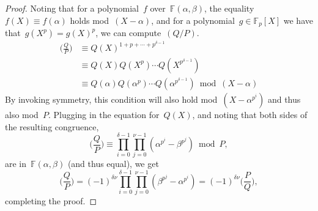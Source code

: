 \begin{theorem}
\begin{proof}
    Noting that for a polynomial~${f}$ over~${\mathbb{F}(\alpha,\beta)}$, the equality~${f(X) \equiv f(\alpha)}$ holds mod~${(X-\alpha)}$, and for a polynomial~${g \in \mathbb{F}_{p}[X]}$ we have that~${g(X^{p})=g(X)^{p}}$, we can compute~${(Q/P)}$.
    \begin{align*} \bigg( \frac{Q}{P} \bigg) & \equiv Q(X)^{1+p+\cdots+p^{\delta-1}} \\ & \equiv Q(X)Q(X^{p}) \cdots Q(X^{p^{\delta -1}}) \\ & \equiv Q(\alpha)Q(\alpha^{p}) \cdots Q(\alpha^{p^{\delta-1}}) \bmod (X-\alpha) \end{align*}
    By invoking symmetry, this condition will also hold mod~${(X-\alpha^{p^{i}})}$ and thus also mod~${P}$. Plugging in the equation for~$Q(X)$, and noting that both sides of the resulting congruence,
    \begin{equation}
      \bigg( \frac{Q}{P} \bigg) \equiv \prod_{i=0}^{\delta -1} \prod_{j=0}^{\nu -1} (\alpha^{p^{i}} - \beta^{p^{j}}) \bmod P,  
    \end{equation}
    are in~${\mathbb{F}(\alpha,\beta)}$ (and thus equal), we get
    \begin{equation}
      \bigg( \frac{Q}{P} \bigg) = (-1)^{\delta \nu} \prod_{i=0}^{\delta -1} \prod_{j=0}^{\nu -1} (\beta^{p^{j}} - \alpha^{p^{i}}) = (-1)^{\delta \nu} \bigg( \frac{P}{Q} \bigg),  
    \end{equation}
    completing the proof.
  \end{proof}
\end{theorem}


